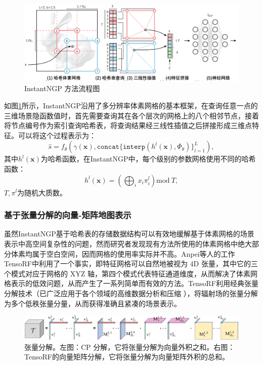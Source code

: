 \begin{figure}[ht]
    \centering
    \includegraphics[width=\textwidth]{undergraduate-thesis/images/related-work/instantngp.pdf}
    \caption{InstantNGP\cite{muller_instant_2022} 方法流程图}
    \label{fig:related-work instantngp}
\end{figure}

如图\ref{fig:related-work instantngp}所示，InstantNGP沿用了多分辨率体素网格的基本框架，在查询任意一点的三维场景隐函数值时，首先需要查询其在各个层次的网格上的八个相邻节点，接着将节点编号作为索引查询哈希表，将查询结果经三线性插值之后拼接形成三维点特征。可以将这个过程表示为：
\begin{equation}
    \hat{s} = f_\theta(\gamma(\mathbf{x}), \mathtt{concat}\{\mathtt{interp}(h^l(\mathbf{x}), \Phi_\theta)\}_{l=1}^L),
\end{equation}
其中$h^l(\mathbf{x})$为哈希函数，在InstantNGP中，每个级别的参数网格使用不同的哈希函数：
\begin{equation}
    h^l(\mathbf{x}) = \left(\bigoplus_{i}x_i\pi_i^l\right) \text{mod}\ T,
\end{equation}
$T, \pi^l$为随机大质数。

\subsubsection{基于张量分解的向量-矩阵地图表示}
虽然InstantNGP基于哈希表的存储数据结构可以有效地缓解基于体素网格的场景表示中高空间复杂性的问题，然而研究者发现现有方法所使用的体素网格中绝大部分体素均属于空白空间，因而网格的使用率实际并不高。Anpei等人\cite{chen_tensorf_2022}的工作TensoRF中利用了一个事实，即特征网格可以自然地被视为 4D 张量，其中它的三个模式对应于网格的 XYZ 轴，第四个模式代表特征通道维度，从而解决了体素网格表示的低效问题，从而产生了一系列简单而有效的方法。TensoRF利用经典张量分解技术（已广泛应用于各个领域的高维数据分析和压缩 \cite{kolda_tensor_2009}），将辐射场的张量分解为多个低秩张量分量，从而获得准确且紧凑的场景表示。

\begin{figure}[ht]
    \centering
    \includegraphics[width=\textwidth]{undergraduate-thesis/images/related-work/Tensor Decomp.png}
    \caption{张量分解\cite{chen_tensorf_2022}。左图：CP 分解，它将张量分解为向量外积之和。右图：TensoRF的向量矩阵分解，它将张量分解为向量矩阵外积的总和。}
    \label{fig:related-work tensor-decomp}
\end{figure}

